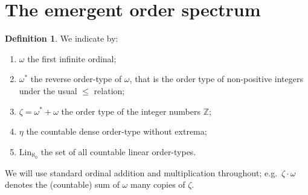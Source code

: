 \documentclass[10pt,a4paper]{article}
\theoremstyle{definition}
\newtheorem{defi}{Definition}[section]
\theoremstyle{remark}
\theoremstyle{plain}
\newtheorem{rem}[defi]{Remark}
\begin{document}
\section{The emergent order spectrum}
\begin{defi}
    We indicate by:
    \begin{enumerate}
        \item [i)] $\omega$ the first infinite ordinal;
        \item [ii)] $\omega^*$ the reverse order-type of $\omega$, that is the order type of non-positive integers under the usual $\leq$ relation;
        \item[iii)] $\zeta=\omega^*+\omega$ the order type of the integer numbers $\mathbb Z$;
        \item[iv)] $\eta$ the countable dense order-type without extrema; 
        \item[v)] $\text{Lin}_{\aleph_0}$ the set of all countable linear order-types.
    \end{enumerate} 
\end{defi}


We will use standard ordinal addition and multiplication throughout; e.g.\ $\zeta\cdot\omega$ denotes the (countable) sum of $\omega$ many copies of $\zeta$.




    
\end{document}
